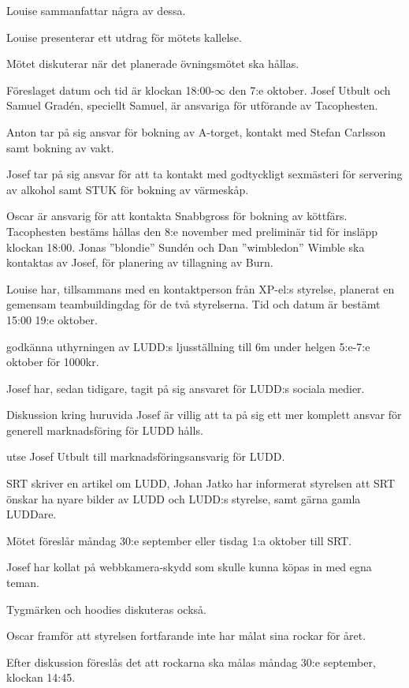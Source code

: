 \documentclass{protokoll}
\begin{document}
Louise sammanfattar några av dessa. 

Louise presenterar ett utdrag för mötets kallelse.

Mötet diskuterar när det planerade övningsmötet ska hållas.


Föreslaget datum och tid är klockan 18:00-$\infty$ den 7:e oktober.
Josef Utbult och Samuel Gradén, speciellt Samuel, är ansvariga för utförande av 
Tacophesten. 

Anton tar på sig ansvar för bokning av A-torget, kontakt med Stefan Carlsson 
samt bokning av vakt.

Josef tar på sig ansvar för att ta kontakt med godtyckligt sexmästeri för 
servering av alkohol samt STUK för bokning av värmeskåp.

Oscar är ansvarig för att kontakta Snabbgross för bokning av köttfärs.
Tacophesten bestäms hållas den 8:e november med preliminär tid för insläpp
klockan 18:00.
Jonas ''blondie'' Sundén och Dan ''wimbledon'' Wimble ska kontaktas av Josef,
för planering av tillagning av Burn. 

Louise har, tillsammans med en kontaktperson från XP-el:s styrelse, planerat en
gemensam teambuildingdag för de två styrelserna. Tid och datum är bestämt 15:00
19:e oktober. 

\begin{beslut}
  \att godkänna uthyrningen av LUDD:s ljusställning till 6m under helgen
  5:e-7:e oktober för 1000kr.
\end{beslut}

Josef har, sedan tidigare, tagit på sig ansvaret för LUDD:s sociala medier.  

Diskussion kring huruvida Josef är villig att ta på sig ett mer komplett
ansvar för generell marknadsföring för LUDD hålls.
\begin{beslut}
  \att utse Josef Utbult till marknadsföringsansvarig för LUDD.
\end{beslut}

SRT skriver en artikel om LUDD, Johan Jatko har informerat styrelsen att SRT
önskar ha nyare bilder av LUDD och LUDD:s styrelse, samt gärna gamla LUDDare. 

Mötet föreslår måndag 30:e september eller tisdag 1:a oktober till SRT.

Josef har kollat på webbkamera-skydd som skulle kunna köpas in med egna teman. 


Tygmärken och hoodies diskuteras också. 

Oscar framför att styrelsen fortfarande inte har målat sina rockar för året. 


Efter diskussion föreslås det att rockarna ska målas måndag 30:e september, 
klockan 14:45.
\end{document}
